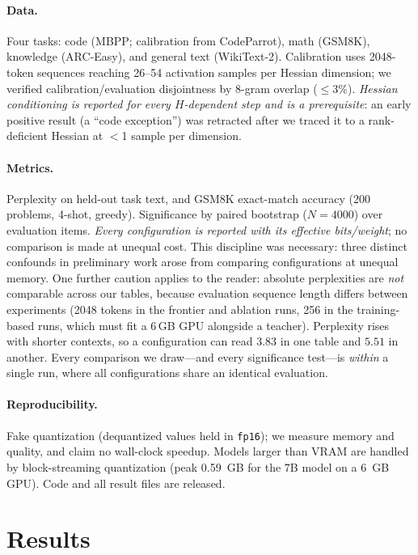 \documentclass[11pt]{article}
\newcommand{\bpw}{bits/weight}
\newcommand{\code}[1]{\texttt{#1}}
\begin{document}
\paragraph{Data.} Four tasks: code (MBPP; calibration from CodeParrot), math
(GSM8K), knowledge (ARC-Easy), and general text (WikiText-2). Calibration uses
2048-token sequences reaching 26--54 activation samples per Hessian dimension;
we verified calibration/evaluation disjointness by 8-gram overlap
($\le$3\%). \emph{Hessian conditioning is reported for every $H$-dependent step
and is a prerequisite}: an early positive result (a ``code exception'') was
retracted after we traced it to a rank-deficient Hessian at $<$1 sample per
dimension.

\paragraph{Metrics.} Perplexity on held-out task text, and GSM8K exact-match
accuracy (200 problems, 4-shot, greedy). Significance by paired bootstrap
($N{=}4000$) over evaluation items. \emph{Every configuration is reported with
its effective \bpw{}}; no comparison is made at unequal cost. This discipline
was necessary: three distinct confounds in preliminary work arose from
comparing configurations at unequal memory. One further caution applies to the
reader: absolute perplexities are \emph{not} comparable across our tables,
because evaluation sequence length differs between experiments (2048 tokens in
the frontier and ablation runs, 256 in the training-based runs, which must fit
a 6\,GB GPU alongside a teacher). Perplexity rises with shorter contexts, so a
configuration can read $3.83$ in one table and $5.51$ in another. Every
comparison we draw---and every significance test---is \emph{within} a single
run, where all configurations share an identical evaluation.

\paragraph{Reproducibility.} Fake quantization (dequantized values held in
\code{fp16}); we measure memory and quality, and claim no wall-clock speedup.
Models larger than VRAM are handled by block-streaming quantization (peak
0.59~GB for the 7B model on a 6~GB GPU). Code and all result files are
released.

\section{Results}
\label{sec:results}
\end{document}
